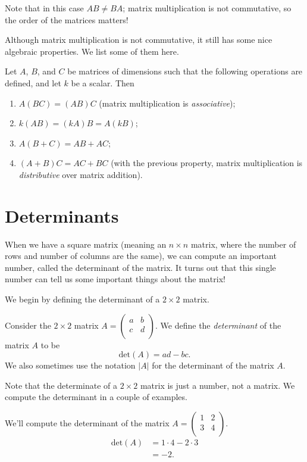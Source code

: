 \documentclass{ximera}
\begin{document}
\begin{example}
Note that in this case $AB\neq BA$; matrix multiplication is not commutative, so the order of the matrices matters!
\end{example}

Although matrix multiplication is not commutative, it still has some nice algebraic properties. We list some of them here.

\begin{proposition}
Let $A$, $B$, and $C$ be matrices of dimensions such that the following operations are defined, and let $k$ be a scalar. Then
\begin{enumerate}
\item $A(BC) = (AB)C$ (matrix multiplication is \emph{associative});
\item $k(AB) = (kA)B = A(kB)$;
\item $A(B+C) = AB+AC$;
\item $(A+B)C = AC+BC$ (with the previous property, matrix multiplication is \emph{distributive} over matrix addition).
\end{enumerate}
\end{proposition}

\section*{Determinants}

When we have a square matrix (meaning an $n\times n$ matrix, where the number of rows and number of columns are the same), we can compute an important number, called the determinant of the matrix. It turns out that this single number can tell us some important things about the matrix!

We begin by defining the determinant of a $2\times 2$ matrix.

\begin{definition}
Consider the $2\times 2$ matrix $A=\left(\begin{array}{cc}a & b \\ c & d\\\end{array}\right)$. We define the \emph{determinant} of the matrix $A$ to be
\[
\textrm{det}(A) = ad-bc.
\]
We also sometimes use the notation $|A|$ for the determinant of the matrix $A$.
\end{definition}

Note that the determinate of a $2\times 2$ matrix is just a number, not a matrix. We compute the determinant in a couple of examples.

\begin{example}
We'll compute the determinant of the matrix $A = \left(\begin{array}{cc}1 & 2 \\ 3 & 4\\\end{array}\right)$.
\begin{align*}
\textrm{det}(A) &= 1\cdot 4 - 2\cdot 3\\
&= -2.
\end{align*}
\end{example}
\end{document}
